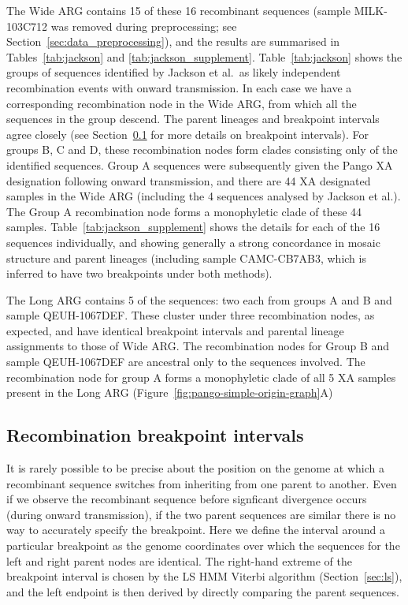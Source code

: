 \documentclass{article}
\begin{document}
The Wide ARG contains 15 of these 16 recombinant sequences
(sample MILK-103C712 was removed during preprocessing; see
Section~\ref{sec:data_preprocessing}), and the results are summarised
in Tables~\ref{tab:jackson} and \ref{tab:jackson_supplement}.
Table~\ref{tab:jackson} shows the groups of sequences identified by Jackson
et al.\ as likely independent recombination events with onward transmission.
In each case we have a corresponding recombination node in the Wide ARG,
from which all the sequences in the group descend. The parent lineages
and breakpoint intervals agree closely (see
Section~\ref{sec:breakpoint_intervals} for more details on breakpoint
intervals).
For groups B, C and D,
these recombination nodes form clades consisting only of the identified
sequences.
Group A sequences were subsequently given the Pango XA designation
following onward transmission,
and there are 44 XA designated samples in the Wide ARG (including the
4 sequences analysed by Jackson et al.). The Group A recombination
node forms a monophyletic clade of these 44 samples.
Table~\ref{tab:jackson_supplement} shows the details for each of the
16 sequences individually, and showing generally a strong concordance
in mosaic structure and parent lineages
(including sample CAMC-CB7AB3, which is inferred to have two breakpoints under both
methods).

The Long ARG contains 5 of the sequences: two each from groups A and B
and sample QEUH-1067DEF. These cluster under three recombination nodes, as expected,
and have identical breakpoint intervals and parental lineage assignments
to those of Wide ARG.
The recombination nodes for Group B and sample QEUH-1067DEF are ancestral only
to the sequences involved.
The recombination node for group A forms a monophyletic clade of all
5 XA samples present in the Long ARG
(Figure~\ref{fig:pango-simple-origin-graph}A)

\subsection{Recombination breakpoint intervals}
\label{sec:breakpoint_intervals}
It is rarely possible to be precise about the position on the genome at which
a recombinant sequence switches from inheriting from one parent to another.
Even if we observe the recombinant sequence before signficant
divergence occurs (during onward transmission), if the two parent sequences
are similar there is no way to
accurately specify the breakpoint.
Here we define the
interval around a particular breakpoint as the genome coordinates over which the
sequences for the left and right parent nodes are identical. The right-hand
extreme of the breakpoint interval is chosen by the LS HMM Viterbi algorithm
(Section~\ref{sec:ls}), and the left endpoint is then derived by directly
comparing the parent sequences.
\end{document}
